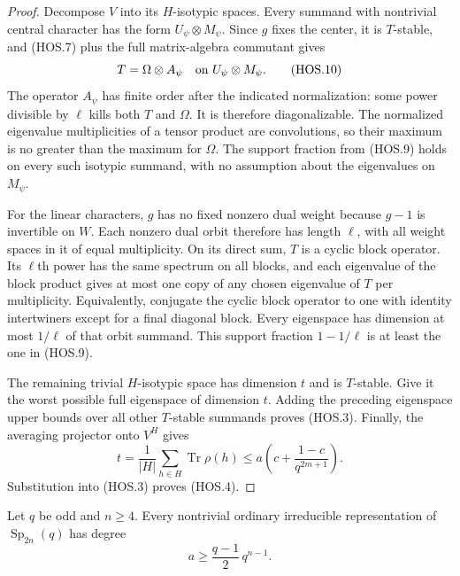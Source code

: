 \begin{proof}
Decompose $V$ into its $H$-isotypic spaces. Every summand
with nontrivial central character has the form
$U_\psi\otimes M_\psi$. Since $g$ fixes the center,
it is $T$-stable, and (HOS.7) plus the full matrix-algebra
commutant gives
\[
                 T=\Omega\otimes A_\psi
                   \quad\hbox{on }U_\psi\otimes M_\psi.
                                                               \tag{HOS.10}
\]
The operator $A_\psi$ has finite order after the indicated
normalization: some power divisible by $\ell$ kills both
$T$ and $\Omega$. It is therefore diagonalizable. The
normalized eigenvalue multiplicities of a tensor product
are convolutions, so their maximum is no greater than
the maximum for $\Omega$. The support fraction from
(HOS.9) holds on every such isotypic summand, with no
assumption about the eigenvalues on $M_\psi$.

For the linear characters, $g$ has no fixed nonzero dual
weight because $g-1$ is invertible on $W$. Each nonzero
dual orbit therefore has length $\ell$, with all weight
spaces in it of equal multiplicity. On its direct sum,
$T$ is a cyclic block operator. Its $\ell$th power has
the same spectrum on all blocks, and each eigenvalue
of the block product gives at most one copy of any
chosen eigenvalue of $T$ per multiplicity. Equivalently,
conjugate the cyclic block operator to one with identity
intertwiners except for a final diagonal block.
Every eigenspace has dimension at most $1/\ell$ of
that orbit summand. This support fraction $1-1/\ell$
is at least the one in (HOS.9).

The remaining trivial $H$-isotypic space has dimension
$t$ and is $T$-stable. Give it the worst possible full
eigenspace of dimension $t$. Adding the preceding
eigenspace upper bounds over all other $T$-stable
summands proves (HOS.3). Finally, the averaging projector
onto $V^H$ gives
\[
 t=\frac1{|H|}\sum_{h\in H}\operatorname{Tr}\rho(h)
       \le a\left(c+\frac{1-c}{q^{2m+1}}\right).
                                                               \tag{HOS.11}
\]
Substitution into (HOS.3) proves (HOS.4).
\end{proof}

\begin{lemma}
\label{D-HOS-02}
Let $q$ be odd and $n\ge4$. Every nontrivial ordinary irreducible
representation of $\operatorname{Sp}_{2n}(q)$ has degree
\[
                     a\ge\frac{q-1}{2}\,q^{n-1}.
                                                               \tag{HOS.12}
\]
\end{lemma}

